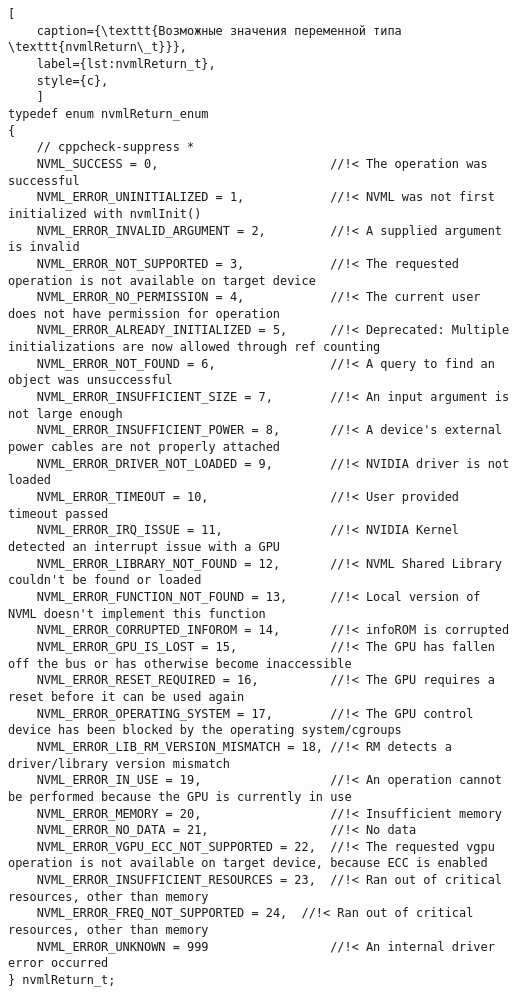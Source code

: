 \begin{lstlisting}[
	caption={\texttt{Возможные значения переменной типа \texttt{nvmlReturn\_t}}},
	label={lst:nvmlReturn_t},
	style={c},
	]
typedef enum nvmlReturn_enum
{
	// cppcheck-suppress *
	NVML_SUCCESS = 0,                        //!< The operation was successful
	NVML_ERROR_UNINITIALIZED = 1,            //!< NVML was not first initialized with nvmlInit()
	NVML_ERROR_INVALID_ARGUMENT = 2,         //!< A supplied argument is invalid
	NVML_ERROR_NOT_SUPPORTED = 3,            //!< The requested operation is not available on target device
	NVML_ERROR_NO_PERMISSION = 4,            //!< The current user does not have permission for operation
	NVML_ERROR_ALREADY_INITIALIZED = 5,      //!< Deprecated: Multiple initializations are now allowed through ref counting
	NVML_ERROR_NOT_FOUND = 6,                //!< A query to find an object was unsuccessful
	NVML_ERROR_INSUFFICIENT_SIZE = 7,        //!< An input argument is not large enough
	NVML_ERROR_INSUFFICIENT_POWER = 8,       //!< A device's external power cables are not properly attached
	NVML_ERROR_DRIVER_NOT_LOADED = 9,        //!< NVIDIA driver is not loaded
	NVML_ERROR_TIMEOUT = 10,                 //!< User provided timeout passed
	NVML_ERROR_IRQ_ISSUE = 11,               //!< NVIDIA Kernel detected an interrupt issue with a GPU
	NVML_ERROR_LIBRARY_NOT_FOUND = 12,       //!< NVML Shared Library couldn't be found or loaded
	NVML_ERROR_FUNCTION_NOT_FOUND = 13,      //!< Local version of NVML doesn't implement this function
	NVML_ERROR_CORRUPTED_INFOROM = 14,       //!< infoROM is corrupted
	NVML_ERROR_GPU_IS_LOST = 15,             //!< The GPU has fallen off the bus or has otherwise become inaccessible
	NVML_ERROR_RESET_REQUIRED = 16,          //!< The GPU requires a reset before it can be used again
	NVML_ERROR_OPERATING_SYSTEM = 17,        //!< The GPU control device has been blocked by the operating system/cgroups
	NVML_ERROR_LIB_RM_VERSION_MISMATCH = 18, //!< RM detects a driver/library version mismatch
	NVML_ERROR_IN_USE = 19,                  //!< An operation cannot be performed because the GPU is currently in use
	NVML_ERROR_MEMORY = 20,                  //!< Insufficient memory
	NVML_ERROR_NO_DATA = 21,                 //!< No data
	NVML_ERROR_VGPU_ECC_NOT_SUPPORTED = 22,  //!< The requested vgpu operation is not available on target device, because ECC is enabled
	NVML_ERROR_INSUFFICIENT_RESOURCES = 23,  //!< Ran out of critical resources, other than memory
	NVML_ERROR_FREQ_NOT_SUPPORTED = 24,  //!< Ran out of critical resources, other than memory
	NVML_ERROR_UNKNOWN = 999                 //!< An internal driver error occurred
} nvmlReturn_t;
\end{lstlisting}

